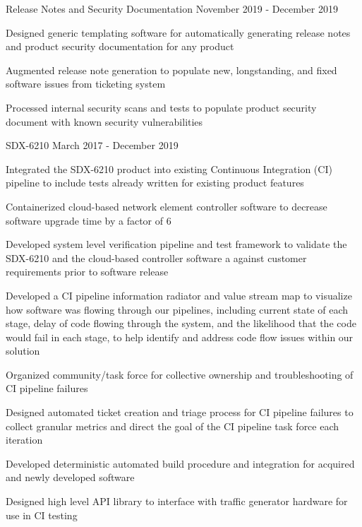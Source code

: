 \begin{cventries}
  \cventry
    {} {Release Notes and Security Documentation} {} {November 2019 - December 2019} {
      \begin{cvitems}
        \item {Designed generic templating software for automatically generating release notes and product security documentation for any product}
        \item {Augmented release note generation to populate new, longstanding, and fixed software issues from ticketing system}
        \item {Processed internal security scans and tests to populate product security document with known security vulnerabilities}
      \end{cvitems}
    }

  \cventry
    {} {SDX-6210} {} {March 2017 - December 2019} {
      \begin{cvitems} %
        \item {Integrated the SDX-6210 product into existing Continuous Integration (CI) pipeline to include tests already written for existing product features}
        \item {Containerized cloud-based network element controller software to decrease software upgrade time by a factor of 6}
        \item {Developed system level verification pipeline and test framework to validate the SDX-6210 and the cloud-based controller software a against customer requirements prior to software release}
        \item {Developed a CI pipeline information radiator and value stream map to visualize how software was flowing through our pipelines, including current state of each stage, delay of code flowing through the system, and the likelihood that the code would fail in each stage, to help identify and address code flow issues within our solution}
        \item {Organized community/task force for collective ownership and troubleshooting of CI pipeline failures}
        \item {Designed automated ticket creation and triage process for CI pipeline failures to collect granular metrics and direct the goal of the CI pipeline task force each iteration}
        \item {Developed deterministic automated build procedure and integration for acquired and newly developed software}
        \item {Designed high level API library to interface with traffic generator hardware for use in CI testing}

\end{cvitems}}
\end{cventries}
